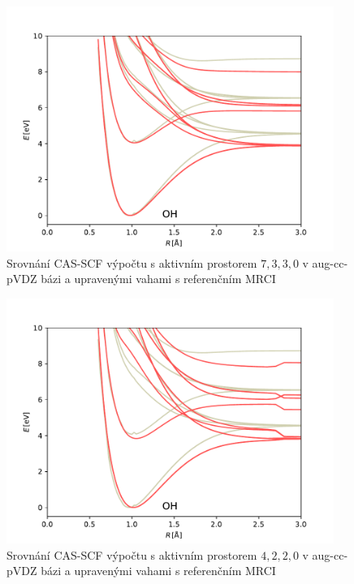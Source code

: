 \begin{figure}
\centering
\includegraphics[width=0.95\textwidth]{../img/OH-MULTI-DZ-7330-w1.pdf}
\caption{Srovnání CAS-SCF výpočtu s aktivním prostorem $7,3,3,0$ v aug-cc-pVDZ bázi a upravenými vahami s referenčním MRCI}
\label{gr_OH_7330_w}
\end{figure}

\begin{figure}
\centering
\includegraphics[width=0.95\textwidth]{../img/OH-MULTI-DZ-4220-w1.pdf}
\caption{Srovnání CAS-SCF výpočtu s aktivním prostorem $4,2,2,0$ v aug-cc-pVDZ bázi a  
upravenými vahami s referenčním MRCI}
\label{gr_OH_4220_w}
\end{figure}

